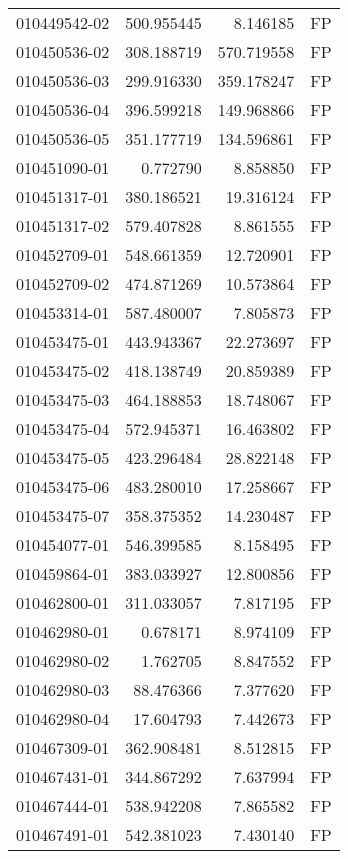\begin{tabular}{lrrl}
010449542-02 &  500.955445 &     8.146185 &   FP \\
010450536-02 &  308.188719 &   570.719558 &   FP \\
010450536-03 &  299.916330 &   359.178247 &   FP \\
010450536-04 &  396.599218 &   149.968866 &   FP \\
010450536-05 &  351.177719 &   134.596861 &   FP \\
010451090-01 &    0.772790 &     8.858850 &   FP \\
010451317-01 &  380.186521 &    19.316124 &   FP \\
010451317-02 &  579.407828 &     8.861555 &   FP \\
010452709-01 &  548.661359 &    12.720901 &   FP \\
010452709-02 &  474.871269 &    10.573864 &   FP \\
010453314-01 &  587.480007 &     7.805873 &   FP \\
010453475-01 &  443.943367 &    22.273697 &   FP \\
010453475-02 &  418.138749 &    20.859389 &   FP \\
010453475-03 &  464.188853 &    18.748067 &   FP \\
010453475-04 &  572.945371 &    16.463802 &   FP \\
010453475-05 &  423.296484 &    28.822148 &   FP \\
010453475-06 &  483.280010 &    17.258667 &   FP \\
010453475-07 &  358.375352 &    14.230487 &   FP \\
010454077-01 &  546.399585 &     8.158495 &   FP \\
010459864-01 &  383.033927 &    12.800856 &   FP \\
010462800-01 &  311.033057 &     7.817195 &   FP \\
010462980-01 &    0.678171 &     8.974109 &   FP \\
010462980-02 &    1.762705 &     8.847552 &   FP \\
010462980-03 &   88.476366 &     7.377620 &   FP \\
010462980-04 &   17.604793 &     7.442673 &   FP \\
010467309-01 &  362.908481 &     8.512815 &   FP \\
010467431-01 &  344.867292 &     7.637994 &   FP \\
010467444-01 &  538.942208 &     7.865582 &   FP \\
010467491-01 &  542.381023 &     7.430140 &   FP \\

\end{tabular}
